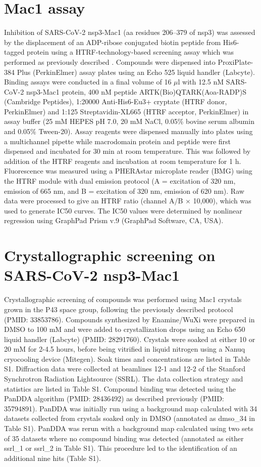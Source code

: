 \section{Mac1 assay} \label{appendix:mac1_assay}
Inhibition of SARS-CoV-2 nsp3-Mac1 (aa residues 206–379 of nsp3) was assessed by the displacement of an ADP-ribose conjugated biotin peptide from His6-tagged protein using a HTRF-technology-based screening assay which was performed as previously described \cite{Schuller2021Mac1Frag}. Compounds were dispensed into ProxiPlate-384 Plus (PerkinElmer) assay plates using an Echo 525 liquid handler (Labcyte). Binding assays were conducted in a final volume of 16 $\mu$l with 12.5 nM SARS-CoV-2 nsp3-Mac1 protein, 400 nM peptide ARTK(Bio)QTARK(Aoa-RADP)S (Cambridge Peptides), 1:20000 Anti-His6-Eu3+ cryptate (HTRF donor, PerkinElmer) and 1:125 Streptavidin-XL665 (HTRF acceptor, PerkinElmer) in assay buffer (25 mM HEPES pH 7.0, 20 mM NaCl, 0.05\% bovine serum albumin and 0.05\% Tween-20). Assay reagents were dispensed manually into plates using a multichannel pipette while macrodomain protein and peptide were first dispensed and incubated for 30 min at room temperature. This was followed by addition of the HTRF reagents and incubation at room temperature for 1 h. Fluorescence was measured using a PHERAstar microplate reader (BMG) using the HTRF module with dual emission protocol (A = excitation of 320 nm, emission of 665 nm, and B = excitation of 320 nm, emission of 620 nm). Raw data were processed to give an HTRF ratio (channel A/B $\times$ 10,000), which was used to generate IC50 curves. The IC50 values were determined by nonlinear regression using GraphPad Prism v.9 (GraphPad Software, CA, USA).

\section{Crystallographic screening on SARS-CoV-2 nsp3-Mac1} \label{appendix:mac1_crystallography}
Crystallographic screening of compounds was performed using Mac1 crystals grown in the P43 space group, following the previously described protocol (PMID: 33853786). Compounds synthesized by Enamine/WuXi were prepared in DMSO to 100 mM and were added to crystallization drops using an Echo 650 liquid handler (Labcyte) (PMID: 28291760). Crystals were soaked at either 10 or 20 mM for 2-4.5 hours, before being vitrified in liquid nitrogen using a Nanuq cryocooling device (Mitegen). Soak times and concentrations are listed in Table S1. Diffraction data were collected at beamlines 12-1 and 12-2 of the Stanford Synchrotron Radiation Lightsource (SSRL). The data collection strategy and statistics are listed in Table S1. Compound binding was detected using the PanDDA algorithm (PMID: 28436492) as described previously (PMID: 35794891). PanDDA was initially run using a background map calculated with 34 datasets collected from crystals soaked only in DMSO (annotated as dmso\_34 in Table S1). PanDDA was rerun with a background map calculated using two sets of 35 datasets where no compound binding was detected (annotated as either ssrl\_1 or ssrl\_2 in Table S1). This procedure led to the identification of an additional nine hits (Table S1). 

